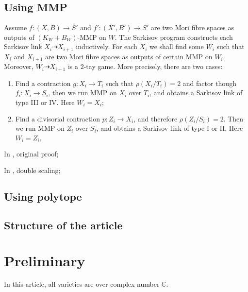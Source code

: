 \documentclass{article}
\begin{document}
\subsection{Using MMP}
Assume $f:(X,B)\to S'$ and $f':(X',B')\to S'$ are two Mori fibre spaces as outputs of $(K_{W}+B_{W})$-MMP on $W$. The Sarkisov program constructs each Sarkisov link $X_{i}\dashrightarrow X_{i+1}$ inductively. For each $X_{i}$ we shall find some $W_{i}$ such that $X_{i}$ and $X_{i+1}$ are two Mori fibre spaces as outputs of certain MMP on $W_{i}$. Moreover, $W_{i}\dashrightarrow X_{i+1}$ is a $2$-tay game. More precisely, there are two cases:
\begin{enumerate}[A]
  \item Find a contraction $g:X_{i} \to T_{i}$ such that $\rho(X_{i}/T_{i})=2$ and factor though $f_{i}:X_{i} \to S_{i}$, then we run MMP on  $X_{i} $ over $T_{i}$, and obtains a Sarkisov link of type III or IV. Here $W_{i}=X_{i}$;
    \item  Find a divisorial contraction $p:Z_{i}\to X_{i}$, and therefore $\rho(Z_{i}/S_{i})=2$. Then we run MMP on $Z_{i}$ over $S_{i}$, and obtains a Sarkisov link of type I or II. Here $W_{i}=Z_{i}$. 
\end{enumerate}
In \cite{cortiFactoringBirationalMaps}, original proof; 

In \cite{haconMinimalModelProgram2012}, double scaling;


\subsection{Using polytope}

\subsection{Structure of the article}

\section{Preliminary}
In this article, all varieties are over complex number $\mathbb{C}$.
\end{document}
